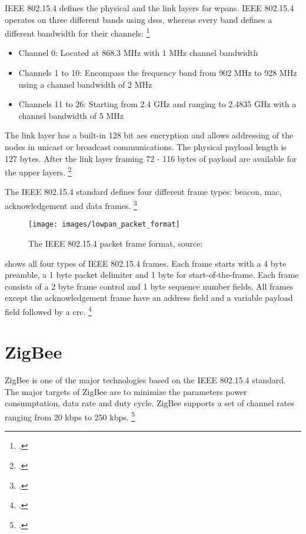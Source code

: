 IEEE 802.15.4 defines the physical and the link layers for \glspl{wpan}. IEEE 802.15.4 operates on three different bands using \gls{dsss}, whereas every band defines a different bandwidth for their channels: \footcite[Cf.][481-482]{Pahlavan2009}

\begin{itemize}
  \item Channel 0: Located at 868.3 MHz with 1 MHz channel bandwidth
  \item Channels 1 to 10: Encompass the frequency band from 902 MHz to 928 MHz using a channel bandwidth of 2 MHz
  \item Channels 11 to 26: Starting from 2.4 GHz and ranging to 2.4835 GHz with a channel bandwidth of 5 MHz
\end{itemize}

The link layer has a built-in 128 bit \gls{aes} encryption and allows addressing of the nodes in unicast or broadcast communications. The physical payload length is 127 bytes. After the link layer framing 72 - 116 bytes of payload are available for the upper layers. \footcite[Cf.][18]{Shelby2009}

The IEEE 802.15.4 standard defines four different frame types: beacon, \gls{mac}, acknowledgement and data frames. \footcite[Cf.][]{RFC4944}

\begin{figure}[ht]
  \centering
  \texttt{[image: images/lowpan\_packet\_format]}
  \caption{The IEEE 802.15.4 packet frame format, source: \cite[483]{Pahlavan2009}}
  \label{fig:lowpan_packet_format}
\end{figure}

 shows all four types of IEEE 802.15.4 frames. Each frame starts with a 4 byte preamble, a 1 byte packet delimiter and 1 byte for start-of-the-frame. Each frame consists of a 2 byte frame control and 1 byte sequence number fields. All frames except the acknowledgement frame have an address field and a variable payload field followed by a \gls{crc}. \footcite[Cf.][]{RFC4944}

\section{ZigBee}
\label{sec:zigbee}

ZigBee is one of the major technologies based on the IEEE 802.15.4 standard. The major targets of ZigBee are to minimize the parameters power consumptation, data rate and duty cycle. ZigBee supports a set of channel rates ranging from 20 kbps to 250 kbps. \footcite[Cf.][545]{Kurose2012}

